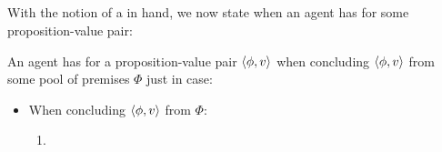 \subsection{}
\label{sec:zs2}

\begin{note}
  With the notion of a \requ{} in hand, we now state when an agent has  for some proposition-value pair:

    \begin{idea}[\izetaS{}]
      \label{idea:zetaS}
    An agent \vAgent{} has \emph{\izetaS{}} for a proposition-value pair \(\langle \phi, v \rangle\) when concluding \(\langle \phi, v \rangle\) from some pool of premises \(\Phi\) just in case:
    \begin{itemize}
    \item When concluding \(\langle \phi, v \rangle\) from \(\Phi\):
    \begin{enumerate}[label=\arabic*., ref=\named{CS:\arabic*}]
    \item

\end{enumerate}
\end{itemize}
\end{idea}
\end{note}
